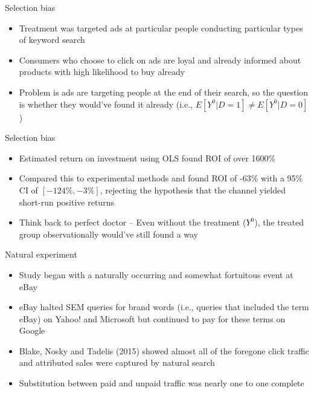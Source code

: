 \documentclass{beamer}
\begin{document}
\begin{frame}{Selection bias}

  \begin{itemize}
    \item Treatment was targeted ads at particular people conducting particular types of keyword search
    \item Consumers who choose to click on ads are loyal and already informed about products with high likelihood to buy already
    \item Problem is ads are targeting people at the end of their search, so the question is whether they would've found it already (i.e., $E[Y^0|D=1] \neq E[Y^0|D=0]$)
  \end{itemize}


\end{frame}



\begin{frame}{Selection bias}

  \begin{itemize}
    \item Estimated return on investment using OLS  found ROI of over 1600\%
    \item Compared this to experimental methods and found ROI of -63\% with a 95\% CI of $[-124\%, -3\%]$, rejecting the hypothesis that the channel yielded short-run positive returns
    \item Think back to perfect doctor -- Even without the treatment ($Y^0$), the treated group observationally would've still found a way
  \end{itemize}

\end{frame}

\begin{frame}{Natural experiment}

  \begin{itemize}
    \item Study began with a naturally occurring and somewhat fortuitous  event at eBay
    \item eBay halted SEM queries for brand words (i.e., queries that included the term eBay) on Yahoo! and Microsoft but continued to pay for these terms on Google
    \item Blake, Nosky and Tadelis (2015) showed almost all of the foregone click traffic and attributed sales were captured by natural search
    \item Substitution between paid and unpaid traffic was nearly one to one complete
  \end{itemize}

\end{frame}
\end{document}
